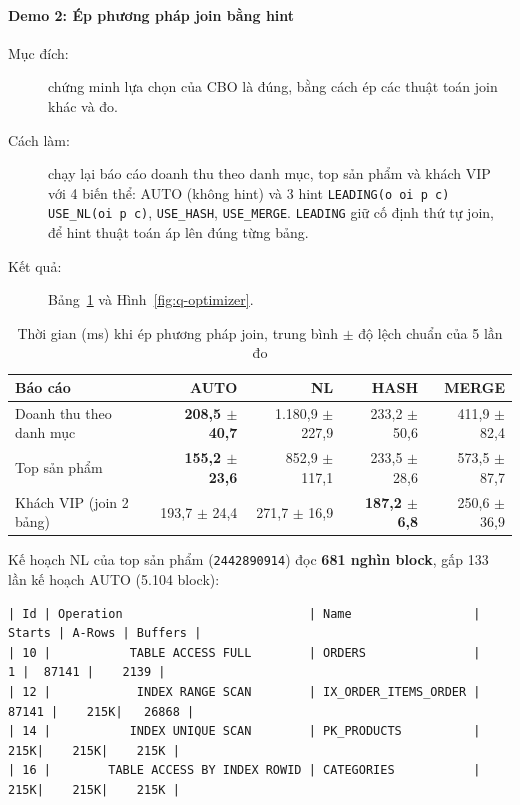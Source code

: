 \paragraph{Demo 2: Ép phương pháp join bằng hint}\label{sec:q-demo2}
\begin{description}
  \item[Mục đích:] chứng minh lựa chọn của CBO là đúng, bằng cách ép các thuật toán join khác và đo.
  \item[Cách làm:] chạy lại báo cáo doanh thu theo danh mục, top sản phẩm và khách VIP với 4 biến thể: AUTO (không hint) và 3 hint \texttt{LEADING(o oi p c) USE\_NL(oi p c)}, \texttt{USE\_HASH}, \texttt{USE\_MERGE}. \texttt{LEADING} giữ cố định thứ tự join, để hint thuật toán áp lên đúng từng bảng.
  \item[Kết quả:] Bảng~\ref{tab:q-hints} và Hình~\ref{fig:q-optimizer}.
\end{description}

\begin{table}[H]
\centering
\caption{Thời gian (ms) khi ép phương pháp join, trung bình $\pm$ độ lệch chuẩn của 5 lần đo}\label{tab:q-hints}
\small
\begin{tabular}{@{}lrrrr@{}}
\toprule
Báo cáo & AUTO & NL & HASH & MERGE \\
\midrule
Doanh thu theo danh mục & \textbf{208,5 $\pm$ 40,7} & 1.180,9 $\pm$ 227,9 & 233,2 $\pm$ 50,6 & 411,9 $\pm$ 82,4 \\
Top sản phẩm & \textbf{155,2 $\pm$ 23,6} & 852,9 $\pm$ 117,1 & 233,5 $\pm$ 28,6 & 573,5 $\pm$ 87,7 \\
Khách VIP (join 2 bảng) & 193,7 $\pm$ 24,4 & 271,7 $\pm$ 16,9 & \textbf{187,2 $\pm$ 6,8} & 250,6 $\pm$ 36,9 \\
\bottomrule
\end{tabular}
\end{table}

Kế hoạch NL của top sản phẩm (\texttt{2442890914}) đọc \textbf{681 nghìn block}, gấp 133 lần kế hoạch AUTO (5.104 block):
\begin{Verbatim}[fontsize=\scriptsize,frame=single]
| Id | Operation                          | Name                 | Starts | A-Rows | Buffers |
| 10 |           TABLE ACCESS FULL        | ORDERS               |      1 |  87141 |    2139 |
| 12 |            INDEX RANGE SCAN        | IX_ORDER_ITEMS_ORDER |  87141 |    215K|   26868 |
| 14 |           INDEX UNIQUE SCAN        | PK_PRODUCTS          |    215K|    215K|    215K |
| 16 |        TABLE ACCESS BY INDEX ROWID | CATEGORIES           |    215K|    215K|    215K |
\end{Verbatim}

